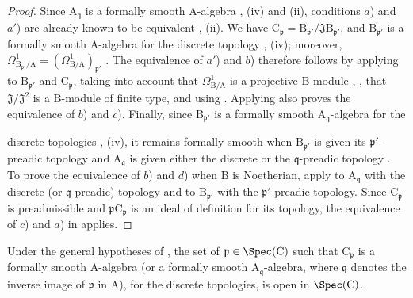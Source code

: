 \begin{proof}
Since $\mathrm{A}_{\mathfrak{q}}$ is a formally smooth
$\mathrm{A}$-algebra , (iv) and (ii), conditions $a$) and
$a'$) are already known to be equivalent , (ii). We have
$\mathrm{C}_\mathfrak{p}=\mathrm{B}_{\mathfrak{p}'}/
\mathfrak{J}\mathrm{B}_{\mathfrak{p}'}$, and
$\mathrm{B}_{\mathfrak{p}'}$ is a formally smooth $\mathrm{A}$-algebra for
the discrete topology , (iv); moreover,
$\Omega^1_{\mathrm{B}_{\mathfrak{p}'}/\mathrm{A}}
=(\Omega^1_{\mathrm{B}/\mathrm{A}})_{\mathfrak{p}'}$ .
The equivalence of $a'$) and $b$) therefore follows by applying
 to $\mathrm{B}_{\mathfrak{p}'}$ and
$\mathrm{C}_\mathfrak{p}$, taking into account that
$\Omega^1_{\mathrm{B}/\mathrm{A}}$ is a projective $\mathrm{B}$-module
, , that
$\mathfrak{J}/\mathfrak{J}^2$ is a $\mathrm{B}$-module of finite type, and
using . Applying  also proves the equivalence
of $b$) and $c$). Finally, since $\mathrm{B}_{\mathfrak{p}'}$ is a formally
smooth $\mathrm{A}_{\mathfrak{q}}$-algebra for the


discrete topologies , (iv), it remains formally smooth when
$\mathrm{B}_{\mathfrak{p}'}$ is given its $\mathfrak{p}'$-preadic topology
and $\mathrm{A}_{\mathfrak{q}}$ is given either the discrete or the
$\mathfrak{q}$-preadic topology . To prove the equivalence of
$b$) and $d$) when $\mathrm{B}$ is Noetherian, apply  to
$\mathrm{A}_{\mathfrak{q}}$ with the discrete (or $\mathfrak{q}$-preadic)
topology and to $\mathrm{B}_{\mathfrak{p}'}$ with the
$\mathfrak{p}'$-preadic topology. Since $\mathrm{C}_\mathfrak{p}$ is
preadmissible and $\mathfrak{p}\mathrm{C}_\mathfrak{p}$ is an ideal of
definition for its topology, the equivalence of $c$) and $a$) in
 applies.
\end{proof}

\begin{corollary}[22.6.5]
\label{0.22.6.5}
Under the general hypotheses of , the set of
$\mathfrak{p}\in\Spec(\mathrm{C})$ such that $\mathrm{C}_\mathfrak{p}$ is a
formally smooth $\mathrm{A}$-algebra (or a formally smooth
$\mathrm{A}_{\mathfrak{q}}$-algebra, where $\mathfrak{q}$ denotes the inverse
image of $\mathfrak{p}$ in $\mathrm{A}$), for the discrete topologies, is open
in $\Spec(\mathrm{C})$.
\end{corollary}

